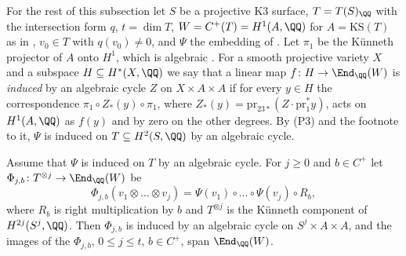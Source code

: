 For the rest of this subsection let $S$ be a projective K3 surface,
$T=T(S)_{\QQ}$ with the intersection form $q$, $t=\dim T$,
$W=C^{+}(T)=H^{1}(A,\QQ)$ for $A=\mathrm{KS}(T)$ as in ,
$v_{0}\in T$ with $q(v_{0})\ne0$, and $\Psi$ the embedding of
. Let $\pi_{1}$ be the K\"unneth projector of $A$ onto
$H^{1}$, which is algebraic \cite[\S2]{Kle68}. For a smooth projective variety
$X$ and a subspace $H\subseteq H^{*}(X,\QQ)$ we say that a linear map
$f\colon H\to\End_{\QQ}(W)$ is \emph{induced} by an algebraic cycle $Z$ on
$X\times A\times A$ if for every $y\in H$ the correspondence
$\pi_{1}\circ Z_{*}(y)\circ\pi_{1}$, where
$Z_{*}(y)=\mathrm{pr}_{23*}(Z\cdot\mathrm{pr}_{1}^{*}y)$, acts on $H^{1}(A,\QQ)$
as $f(y)$ and by zero on the other degrees. By (P3) and the footnote to it,
$\Psi$ is induced on $T\subseteq H^{2}(S,\QQ)$ by an algebraic cycle.

\begin{lemma}\label{lem:ksgenerates}
Assume that $\Psi$ is induced on $T$ by an algebraic cycle. For $j\ge0$ and
$b\in C^{+}$ let $\Phi_{j,b}\colon T^{\otimes j}\to\End_{\QQ}(W)$ be
\[
  \Phi_{j,b}(v_{1}\otimes\dots\otimes v_{j})
  =\Psi(v_{1})\circ\dots\circ\Psi(v_{j})\circ R_{b},
\]
where $R_{b}$ is right multiplication by $b$ and $T^{\otimes j}$ is the
K\"unneth component of $H^{2j}(S^{j},\QQ)$. Then $\Phi_{j,b}$ is induced by an
algebraic cycle on $S^{j}\times A\times A$, and the images of the
$\Phi_{j,b}$, $0\le j\le t$, $b\in C^{+}$, span $\End_{\QQ}(W)$.
\end{lemma}

